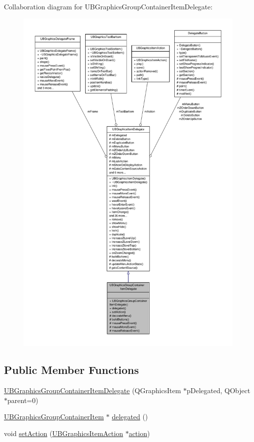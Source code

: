 Collaboration diagram for U\-B\-Graphics\-Group\-Container\-Item\-Delegate\-:
\nopagebreak
\begin{figure}[H]
\begin{center}
\leavevmode
\includegraphics[width=350pt]{dd/dd7/class_u_b_graphics_group_container_item_delegate__coll__graph}
\end{center}
\end{figure}
\subsection*{Public Member Functions}
\begin{DoxyCompactItemize}
\item 
\hyperlink{class_u_b_graphics_group_container_item_delegate_a6b4eaefe62afbb555bd92103d391c627}{U\-B\-Graphics\-Group\-Container\-Item\-Delegate} (Q\-Graphics\-Item $\ast$p\-Delegated, Q\-Object $\ast$parent=0)
\item 
\hyperlink{class_u_b_graphics_group_container_item}{U\-B\-Graphics\-Group\-Container\-Item} $\ast$ \hyperlink{class_u_b_graphics_group_container_item_delegate_a991387e40043f6ec5b6ce602d5300b0f}{delegated} ()
\item 
void \hyperlink{class_u_b_graphics_group_container_item_delegate_a6cd80c1431c47bd41e8f2c935cd43da7}{set\-Action} (\hyperlink{class_u_b_graphics_item_action}{U\-B\-Graphics\-Item\-Action} $\ast$\hyperlink{class_u_b_graphics_item_delegate_ade01e0b179b501cc1c60451cbba96035}{action})
\end{DoxyCompactItemize}
